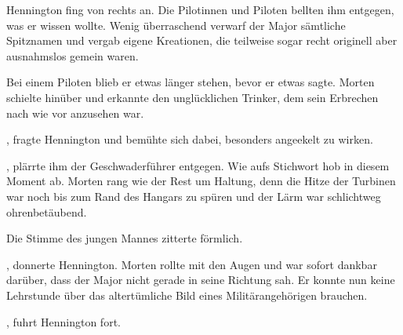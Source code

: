 \par

Hennington fing von rechts an. Die Pilotinnen und Piloten bellten ihm entgegen, was er wissen wollte. Wenig überraschend verwarf der Major sämtliche Spitznamen und vergab eigene Kreationen, die teilweise sogar recht originell aber ausnahmslos gemein waren.

\par

Bei einem Piloten blieb er etwas länger stehen, bevor er etwas sagte. Morten schielte hinüber und erkannte den unglücklichen Trinker, dem sein Erbrechen nach wie vor anzusehen war.

\par

, fragte Hennington und bemühte sich dabei, besonders angeekelt zu wirken.

\par


\par

, plärrte ihm der Geschwaderführer entgegen.  Wie aufs Stichwort hob in diesem Moment  ab. Morten rang wie der Rest um Haltung, denn die Hitze der Turbinen war noch bis zum Rand des Hangars zu spüren und der Lärm war schlichtweg ohrenbetäubend.

\par

 Die Stimme des jungen Mannes zitterte förmlich.

\par

, donnerte Hennington.  Morten rollte mit den Augen und war sofort dankbar darüber, dass der Major nicht gerade in seine Richtung sah. Er konnte nun keine Lehrstunde über das altertümliche Bild eines Militärangehörigen brauchen.

\par

, fuhrt Hennington fort. 

